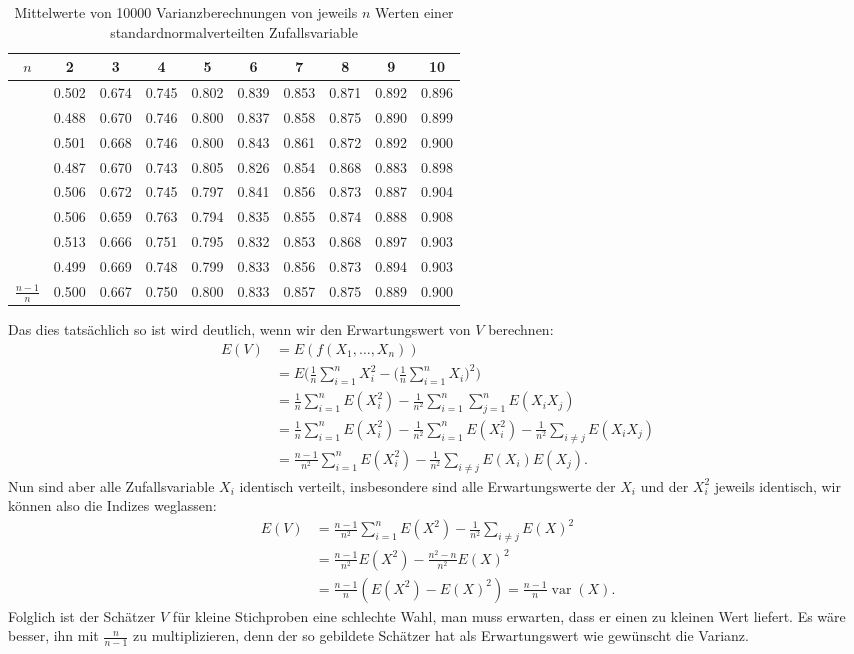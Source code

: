 \begin{table}
\begin{center}
\begin{tabular}{|c|ccccccccc|}
\hline
$n$&2&3&4&5&6&7&8&9&10\\
\hline
&0.502&0.674&0.745&0.802&0.839&0.853&0.871&0.892&0.896\\
&0.488&0.670&0.746&0.800&0.837&0.858&0.875&0.890&0.899\\
&0.501&0.668&0.746&0.800&0.843&0.861&0.872&0.892&0.900\\
&0.487&0.670&0.743&0.805&0.826&0.854&0.868&0.883&0.898\\
&0.506&0.672&0.745&0.797&0.841&0.856&0.873&0.887&0.904\\
&0.506&0.659&0.763&0.794&0.835&0.855&0.874&0.888&0.908\\
&0.513&0.666&0.751&0.795&0.832&0.853&0.868&0.897&0.903\\
&0.499&0.669&0.748&0.799&0.833&0.856&0.873&0.894&0.903\\
\hline
$\frac{n-1}{n}$&0.500&0.667&0.750&0.800&0.833&0.857&0.875&0.889&0.900\\
\hline
\end{tabular}
\end{center}
\caption{Mittelwerte von 10000 Varianzberechnungen von jeweils $n$
Werten einer standardnormalverteilten Zufallsvariable\label{varianzschaetzung}}
\end{table}

Das dies tatsächlich so ist wird deutlich, wenn wir den
Erwartungswert von $V$ berechnen:
\begin{align*}
E(V)
&=
E(f(X_1,\dots,X_n))
\\
&=
E\biggl(
\frac1n\sum_{i=1}^nX_i^2-\biggl(\frac1n\sum_{i=1}^nX_i\biggr)^2
\biggr)
\\
&=
\frac1n\sum_{i=1}^nE(X_i^2)-\frac1{n^2}\sum_{i=1}^n\sum_{j=1}^n E(X_iX_j)
\\
&=
\frac1n\sum_{i=1}^nE(X_i^2)-
\frac1{n^2}\sum_{i=1}^nE(X_i^2)
-\frac1{n^2}\sum_{i\ne j} E(X_iX_j)
\\
&=
\frac{n-1}{n^2}\sum_{i=1}^nE(X_i^2)
-\frac1{n^2}\sum_{i\ne j} E(X_i)E(X_j).
\end{align*}
Nun sind aber alle Zufallsvariable $X_i$ identisch verteilt, insbesondere
sind alle Erwartungswerte der $X_i$ und der $X_i^2$ jeweils identisch,
wir können also die Indizes weglassen:
\begin{align*}
E(V)
&=
\frac{n-1}{n^2}\sum_{i=1}^nE(X^2) -\frac1{n^2}\sum_{i\ne j} E(X)^2
\\
&=
\frac{n-1}{n^2}E(X^2) -\frac{n^2-n}{n^2}E(X)^2
\\
&=
\frac{n-1}{n}(E(X^2) -E(X)^2)=\frac{n-1}n\operatorname{var}(X).
\end{align*}
Folglich ist der Schätzer $V$ für kleine Stichproben eine schlechte
Wahl, man muss erwarten, dass er einen zu kleinen Wert liefert.
Es
wäre besser, ihn mit $\frac{n}{n-1}$ zu multiplizieren, denn der so
gebildete Schätzer hat als Erwartungswert wie gewünscht die Varianz.

